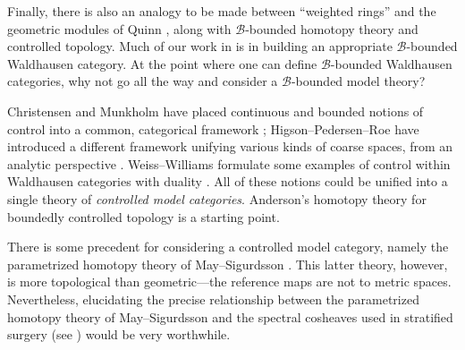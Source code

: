 Finally, there is also an analogy to be made between ``weighted rings'' and the geometric modules of Quinn \cite{MR802791}, along with $\mathcal{B}$-bounded homotopy theory and controlled topology.  Much of our work in \cite{MR2962981} is in building an appropriate $\mathcal{B}$-bounded Waldhausen category.  At the point where one can define $\mathcal{B}$-bounded Waldhausen categories, why not go all the way and consider a $\mathcal{B}$-bounded model theory?

Christensen and Munkholm have placed continuous and bounded notions of control into a common, categorical framework \cite{MR1983017}; Higson--Pedersen--Roe have introduced a different framework unifying various kinds of coarse spaces, from an analytic perspective \cite{MR1451755}.  Weiss--Williams formulate some examples of control within Waldhausen categories with duality \cite{MR1644309}.  All of these notions could be unified into a single theory of \textit{controlled model categories}.  Anderson's homotopy theory for boundedly controlled topology \cite{MR953961} is a starting point.

There is some precedent for considering a controlled model category, namely the parametrized homotopy theory of May--Sigurdsson \cite{MR2271789}.  This latter theory, however, is more topological than geometric---the reference maps are not to metric spaces. Nevertheless, elucidating the precise relationship between the parametrized homotopy theory of May--Sigurdsson and the spectral cosheaves used in stratified surgery (see \cite{MR1308714}) would be very worthwhile.
